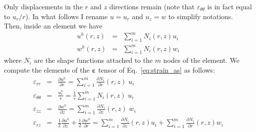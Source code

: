 Only displacements in the $r$ and $z$ directions remain (note that $\varepsilon_{\theta\theta}$ is in fact equal to $u_r/r$). In what follows I rename $u=u_r$ and $u_z=w$ to simplify notations. 
Then, inside an element we have 
\begin{eqnarray}
u^h(r,z) &=& \sum_{i=1}^m N_i(r,z) u_i \nonumber\\
w^h(r,z) &=& \sum_{i=1}^m N_i(r,z) w_i
\end{eqnarray}
where $N_i$ are the shape functions attached 
to the $m$ nodes of the element.
We compute the elements of the ${\bm \varepsilon}$ tensor of Eq.~\eqref{eq:strain_as} as follows:
\begin{eqnarray}
\varepsilon_{rr} &=&
\frac{\partial u^h}{\partial r} 
= \sum_{i=1}^m \frac{\partial N_i}{\partial r}(r,z) \; u_i \\
\varepsilon_{\theta\theta} &=& \frac{u_r^h}{r} = 
\frac{1}{r}\sum_{i=1}^m N_i(r,z) \;  u_i \\
\varepsilon_{zz} &=& 
\frac{\partial w^h}{\partial z}
= \sum_{i=1}^m \frac{\partial N_i}{\partial z}(r,z) \; w_i \\
\varepsilon_{rz} &=& \frac12\frac{\partial u^h}{\partial z}
+\frac12 \frac{\partial w^h}{\partial r}
= \sum_{i=1}^m \frac{\partial N_i}{\partial z}(r,z) u_i 
+ \sum_{i=1}^m \frac{\partial N_i}{\partial r}(r,z) w_i 
\end{eqnarray}

